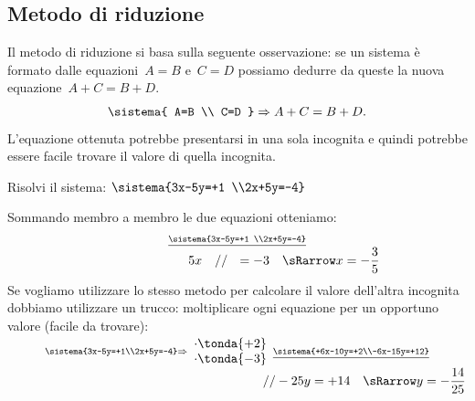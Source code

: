 \subsection{Metodo di riduzione}
Il metodo di riduzione si basa sulla seguente osservazione: se un
sistema è formato dalle equazioni~\(A=B\) e~\(C=D\) possiamo dedurre
da queste la nuova equazione~\(A+C=B+D\).
\begin{equation*}
\sistema{
A=B \\
C=D
}\Rightarrow A+C=B+D.
\end{equation*}
L'equazione ottenuta potrebbe presentarsi in una sola
incognita e quindi potrebbe essere facile trovare il valore di quella
incognita.

\begin{esempio}{}{}
Risolvi il sistema: \quad 
\(\sistema{3x-5y=+1 \\2x+5y=-4}\)

\medskip
Sommando membro a membro le due equazioni otteniamo:\\[-.5em]
\[\stackrel{\underline{\sistema{3x-5y=+1 \\2x+5y=-4}}}
  {\qquad \qquad \qquad ~~~~5x ~~~ // ~~ =
   -3 \quad \sRarrow x=-\frac{3}{5}}\]
Se vogliamo utilizzare lo stesso metodo per calcolare il valore dell'altra 
incognita dobbiamo utilizzare un trucco: moltiplicare ogni equazione per un 
opportuno valore (facile da trovare):\\[+.5em]
\hspace*{-10mm}\(\stackrel{\sistema{3x-5y=+1\\2x+5y=-4}\Rightarrow
\begin{array}{l}\cdot \tonda{+2}\\ \cdot \tonda{-3}\end{array}
  \underline{\sistema{+6x-10y=+2\\-6x-15y=+12}}}
  {\qquad \qquad \qquad \qquad \qquad \qquad \qquad \qquad \qquad \qquad 
   //  -25y  =+14 \quad \sRarrow y=-\dfrac{14}{25}}\)
\end{esempio}

